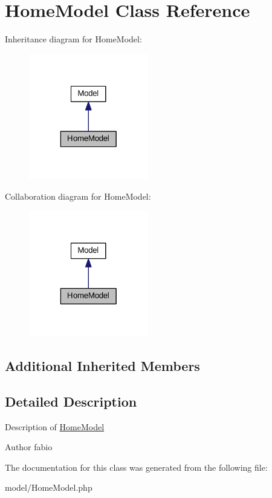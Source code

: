 \hypertarget{classHomeModel}{\section{Home\+Model Class Reference}
\label{classHomeModel}
}


Inheritance diagram for Home\+Model\+:\nopagebreak
\begin{figure}[H]
\begin{center}
\leavevmode
\includegraphics[width=148pt]{classHomeModel__inherit__graph}
\end{center}
\end{figure}


Collaboration diagram for Home\+Model\+:\nopagebreak
\begin{figure}[H]
\begin{center}
\leavevmode
\includegraphics[width=148pt]{classHomeModel__coll__graph}
\end{center}
\end{figure}
\subsection*{Additional Inherited Members}


\subsection{Detailed Description}
Description of \hyperlink{classHomeModel}{Home\+Model}

\begin{DoxyAuthor}{Author}
fabio 
\end{DoxyAuthor}


The documentation for this class was generated from the following file\+:\begin{DoxyCompactItemize}
\item 
model/Home\+Model.\+php\end{DoxyCompactItemize}
